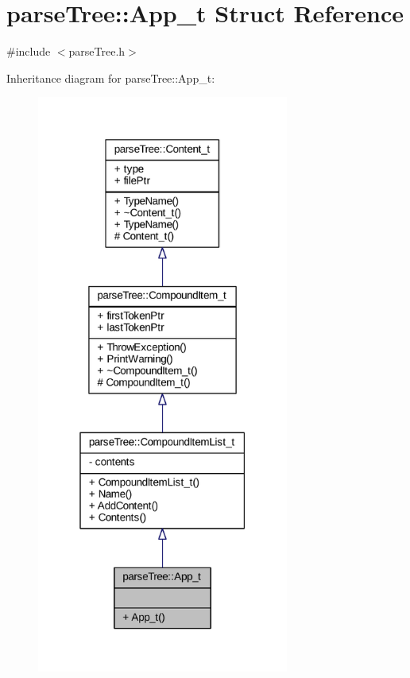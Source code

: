 \hypertarget{structparse_tree_1_1_app__t}{}\section{parse\+Tree\+:\+:App\+\_\+t Struct Reference}
\label{structparse_tree_1_1_app__t}


{\ttfamily \#include $<$parse\+Tree.\+h$>$}



Inheritance diagram for parse\+Tree\+:\+:App\+\_\+t\+:
\nopagebreak
\begin{figure}[H]
\begin{center}
\leavevmode
\includegraphics[width=235pt]{structparse_tree_1_1_app__t__inherit__graph}
\end{center}
\end{figure}


